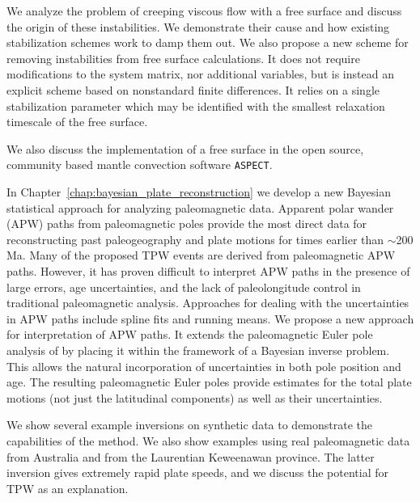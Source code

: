 We analyze the problem of creeping viscous flow with a free surface and discuss the 
origin of these instabilities. We demonstrate their cause and how existing stabilization 
schemes work to damp them out.
We also propose a new scheme for removing instabilities from free surface calculations. 
It does not require modifications to the system matrix, nor additional variables, but is instead
an explicit scheme based on nonstandard finite differences.  It relies on a single 
stabilization parameter which may be identified with the smallest relaxation timescale of the
free surface.

We also discuss the implementation of a free surface in the open source, community based
mantle convection software \texttt{ASPECT}.

In Chapter~\ref{chap:bayesian_plate_reconstruction} we develop a new Bayesian statistical approach
for analyzing paleomagnetic data.
Apparent polar wander (APW) paths from paleomagnetic poles provide the most direct data
for reconstructing past paleogeography and plate motions for times earlier than $\sim$200 Ma. 
Many of the proposed TPW events are derived from paleomagnetic APW paths.
However, it has proven difficult to interpret APW paths in the presence of large errors,
age uncertainties, and the lack of paleolongitude control in traditional paleomagnetic analysis.
Approaches for dealing with the uncertainties in APW paths include spline fits and running means.
We propose a new approach for interpretation of APW paths.
It extends the paleomagnetic Euler pole analysis of \citet{gordon1984paleomagnetic}
by placing it within the framework of a Bayesian inverse problem.
This allows the natural incorporation of uncertainties in both pole position and age.
The resulting paleomagnetic Euler poles provide estimates for the total
plate motions (not just the latitudinal components) as well as their uncertainties.

We show several example inversions on synthetic data to demonstrate the capabilities of the method.
We also show examples using real paleomagnetic data from Australia and 
from the Laurentian Keweenawan province. The latter inversion gives 
extremely rapid plate speeds, and we discuss the potential for TPW as an explanation.

\nocite{newton1728principia}
